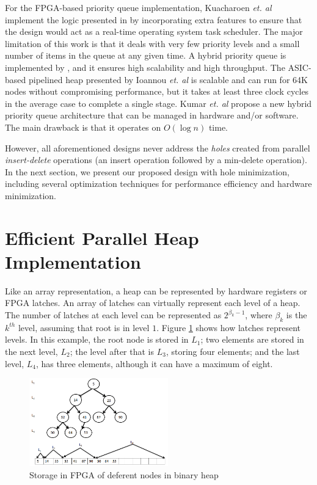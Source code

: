 \documentclass[10pt, conference, compsocconf]{IEEEtran}
\begin{document}
For the FPGA-based priority queue implementation, Kuacharoen {\it et. al} \cite{fpga3} implement the logic presented in \cite{hw3} by incorporating extra features to ensure that the design would act as a real-time operating system task scheduler.
The major limitation of this work is that it deals with very few priority levels and a small number of items in the queue at any given time.
A hybrid priority queue is implemented by \cite{fpga2}, and it ensures high scalability and high throughput.
The ASIC-based pipelined heap presented by Ioannou {\it et. al} \cite{fpga1} is scalable and can run for 64K nodes without compromising performance, but it takes at least three clock cycles in the average case to complete a single stage.
Kumar {\it et. al} \cite{hwsw1} propose a new hybrid priority queue architecture that can be managed in hardware and/or software.
The main drawback is that it operates on $O(\log n)$ time.

However, all aforementioned designs never address the {\it holes} created from parallel {\it insert-delete} operations (an insert operation followed by a min-delete operation).
In the next section, we present our proposed design with hole minimization, including several optimization techniques for performance efficiency and hardware minimization.

\section{Efficient Parallel Heap Implementation}
Like an array representation, a heap can be represented by hardware registers or FPGA latches.
An array of latches can virtually represent each level of a heap.
The number of latches at each level can be represented as $2^{\beta_k-1}$, where $\beta_k$ is the $k^{th}$ level, assuming that root is in level $1$.
Figure \ref{fig5} shows how latches represent levels.
In this example, the root node is stored in $L_1$; two elements are stored in the next level, $L_2$; the level after that is $L_3$, storing four elements; and the last level, $L_4$, has three elements, although it can have a maximum of eight.

\begin{figure}[!ht]
  \centering
  \includegraphics[width=6cm]{Figures/5.png}
      \caption{Storage in FPGA of deferent nodes in binary heap}
    \label{fig5}
\end{figure}
\end{document}
